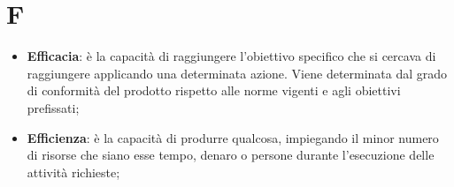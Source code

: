 % 
%
% 
%

\section{F}

\begin{itemize}
	\item \textbf{Efficacia}: è la capacità di raggiungere l'obiettivo specifico che si cercava di raggiungere applicando una determinata azione. \newline
Viene determinata dal grado di conformità del prodotto rispetto alle norme vigenti e agli obiettivi prefissati;

	\item \textbf{Efficienza}: è la capacità di produrre qualcosa, impiegando il minor numero di risorse che siano esse tempo, denaro o persone durante l'esecuzione delle attività richieste; \newline

\end{itemize}